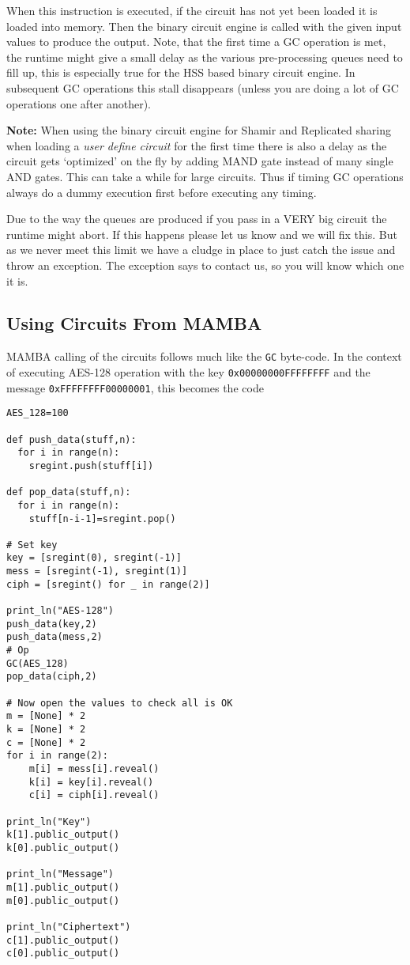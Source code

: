 When this instruction is executed, if the circuit has
not yet been loaded it is loaded into memory. Then the
binary circuit engine is called with the given input
values to produce the output.
Note, that the first time a GC operation is met, the
runtime might give a small delay as the various pre-processing
queues need to fill up, this is especially true for the
HSS based binary circuit engine.
In subsequent GC operations this stall disappears (unless
you are doing a lot of GC operations one after another).

{\bf Note:} When using the binary circuit engine for
Shamir and Replicated sharing when loading a 
{\em user define circuit} for the first time there is
also a delay as the circuit gets `optimized' on the
fly by adding MAND gate instead of many single AND
gates. This can take a while for large circuits.
Thus if timing GC operations always do a dummy execution
first before executing any timing.

Due to the way the queues are produced if you pass in a
VERY big circuit the  runtime might abort. If this happens
please let us know and we will fix this. But as we never
meet this limit we have a cludge in place to just catch
the issue and throw an exception. The exception says
to contact us, so you will know which one it is.

\subsection{Using Circuits From MAMBA}
MAMBA calling of the circuits follows much like the
\verb|GC| byte-code.
In the context of executing AES-128 operation with
the key \verb+0x00000000FFFFFFFF+ and the message
\verb+0xFFFFFFFF00000001+, this becomes the code
\begin{lstlisting}
AES_128=100

def push_data(stuff,n):
  for i in range(n):
    sregint.push(stuff[i])

def pop_data(stuff,n):
  for i in range(n):
    stuff[n-i-1]=sregint.pop()

# Set key
key = [sregint(0), sregint(-1)]
mess = [sregint(-1), sregint(1)]
ciph = [sregint() for _ in range(2)]

print_ln("AES-128")
push_data(key,2)
push_data(mess,2)
# Op
GC(AES_128)
pop_data(ciph,2)

# Now open the values to check all is OK
m = [None] * 2
k = [None] * 2
c = [None] * 2
for i in range(2):
	m[i] = mess[i].reveal()
	k[i] = key[i].reveal()
	c[i] = ciph[i].reveal()

print_ln("Key")
k[1].public_output()     
k[0].public_output()

print_ln("Message")
m[1].public_output()     
m[0].public_output()

print_ln("Ciphertext")
c[1].public_output()     
c[0].public_output()
\end{lstlisting}

